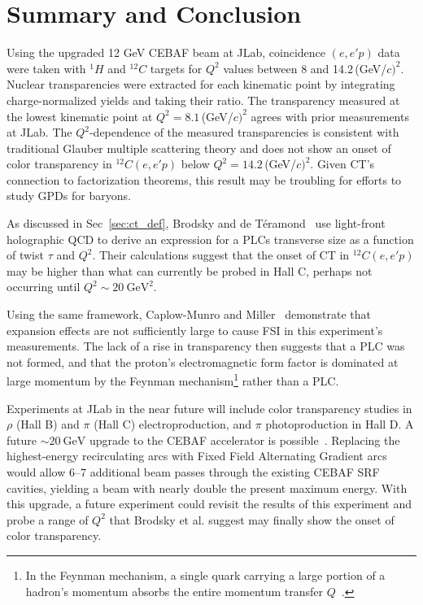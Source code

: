 \chapter{Summary and Conclusion}
Using the upgraded 12\,\,GeV CEBAF beam at JLab, coincidence $(e,e'p)$ data
were taken with $^{1}H$ and $^{12}C$ targets for $Q^2$ values between 8 and
14.2\,(GeV/$c)^2$.
Nuclear transparencies were extracted for each kinematic point by integrating
charge-normalized yields and taking their ratio.
The transparency measured at the lowest kinematic point at
$Q^2=8.1$\,(GeV/$c)^2$ agrees with prior measurements at JLab.
The $Q^2$-dependence of the measured transparencies is consistent with
traditional Glauber multiple scattering theory and does not show an onset of
color transparency in $^{12}C(e,e'p)$ below $Q^2=14.2$\,(GeV/$c)^2$.
Given CT's connection to factorization theorems, this result may be troubling
for efforts to study GPDs for baryons.


As discussed in Sec~\ref{sec:ct_def}, Brodsky and de Téramond~\cite{Brodsky_2021}
use light-front holographic QCD to derive an expression for a PLCs transverse
size as a function of twist $\tau$ and $Q^2$.
Their calculations suggest that the onset of CT in ${}^{12}C(e,e'p)$ may be
higher than what can currently be probed in Hall C, perhaps not occurring
until $Q^2\sim\SI{20}{\giga\electronvolt\squared}$.


Using the same framework, Caplow-Munro and Miller~\cite{CaplowMunro_2021}
demonstrate that expansion effects are not sufficiently large to cause FSI in
this experiment's measurements.
The lack of a rise in transparency then suggests that a PLC was not formed,
and that the proton's electromagnetic form factor is dominated at large
momentum by the Feynman mechanism\footnote{In the Feynman mechanism, a single
quark carrying a large portion of a hadron's momentum absorbs the entire
momentum transfer $Q$~\cite{Drell_1970}.} rather than a PLC.


Experiments at JLab in the near future will include color transparency studies
in $\rho$ (Hall B) and $\pi$ (Hall C) electroproduction, and $\pi$
photoproduction in Hall D.
A future $\sim\SI{20}{\giga\electronvolt}$ upgrade to the CEBAF accelerator is
possible~\cite{Bogacz_2020}.
Replacing the highest-energy recirculating arcs with Fixed Field Alternating
Gradient arcs would allow 6--7 additional beam passes through the existing
CEBAF SRF cavities, yielding a beam with nearly double the present maximum
energy.
With this upgrade, a future experiment could revisit the results of this
experiment and probe a range of $Q^2$ that Brodsky et al. suggest may finally
show the onset of color transparency.
